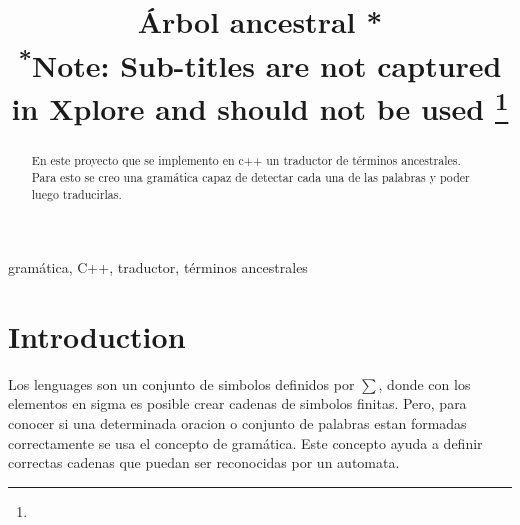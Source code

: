 \documentclass[conference]{IEEEtran}
\begin{document}
\title{\'Arbol ancestral *\\
{\footnotesize \textsuperscript{*}Note: Sub-titles are not captured in Xplore and
should not be used}
\thanks{}
}

\author{
\and
{}
\and
{}
}

\maketitle

\begin{abstract}
En este proyecto que se implemento en c++ un traductor de t\'erminos ancestrales. Para esto se creo una gram\'atica capaz de detectar cada una de las palabras y poder luego traducirlas. 

\end{abstract}

\begin{IEEEkeywords}
gram\'atica, C++, traductor, t\'erminos ancestrales 
\end{IEEEkeywords}

\section{Introduction}
Los lenguages son un conjunto de simbolos definidos por $\sum$, 
donde con los elementos en sigma es posible crear cadenas de simbolos finitas. Pero, para conocer si una determinada oracion o conjunto de palabras estan formadas correctamente se usa el concepto de gram\'atica. Este concepto ayuda a definir correctas cadenas que puedan ser reconocidas por un automata. 
\end{document}
